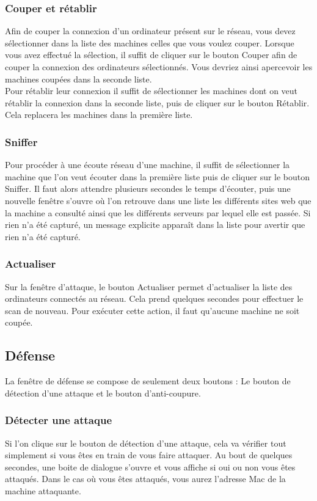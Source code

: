\documentclass[11pt]{article}
\begin{document}
\subsubsection{Couper et rétablir}
Afin de couper la connexion d'un ordinateur présent sur le réseau, vous devez sélectionner dans la liste des machines celles que vous voulez couper. Lorsque vous avez effectué la sélection, il suffit de cliquer sur le bouton Couper afin de couper la connexion des ordinateurs sélectionnés. Vous devriez ainsi apercevoir les machines coupées dans la seconde liste.~\\
Pour rétablir leur connexion il suffit de sélectionner les machines dont on veut rétablir la connexion dans la seconde liste, puis de cliquer sur le bouton Rétablir. Cela replacera les machines dans la première liste.

\subsubsection{Sniffer}
Pour procéder à une écoute réseau d'une machine, il suffit de sélectionner la machine que l'on veut écouter dans la première liste puis de cliquer sur le bouton Sniffer. Il faut alors attendre plusieurs secondes le temps d'écouter, puis une nouvelle fenêtre s'ouvre où l'on retrouve dans une liste les différents sites web que la machine a consulté ainsi que les différents serveurs par lequel elle est passée. Si rien n'a été capturé, un message explicite apparaît dans la liste pour avertir que rien n'a été capturé.

\subsubsection{Actualiser}
Sur la fenêtre d'attaque, le bouton Actualiser permet d'actualiser la liste des ordinateurs connectés au réseau. Cela prend quelques secondes pour effectuer le scan de nouveau. Pour exécuter cette action, il faut qu'aucune machine ne soit coupée.

\subsection{Défense}
La fenêtre de défense se compose de seulement deux boutons : Le bouton de détection d'une attaque et le bouton d'anti-coupure.

\subsubsection{Détecter une attaque}
Si l'on clique sur le bouton de détection d'une attaque, cela va vérifier tout simplement si vous êtes en train de vous faire attaquer. Au bout de quelques secondes, une boite de dialogue s'ouvre et vous affiche si oui ou non vous êtes attaqués. Dans le cas où vous êtes attaqués, vous aurez l'adresse Mac de la machine attaquante.
\end{document}
